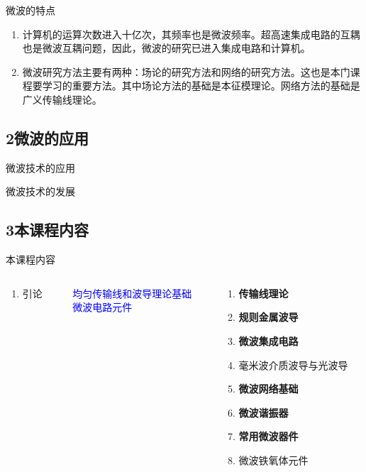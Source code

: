 \documentclass{ctexbeamer}
\newcounter{savedenum}
\newcommand*{\saveenum}{\setcounter{savedenum}{\theenumi}}
\newcommand*{\resume}{\setcounter{enumi}{\thesavedenum}}
\begin{document}
\begin{frame}{微波的特点}
  \begin{enumerate}
    \resume
    \item 计算机的运算次数进入十亿次，其频率也是微波频率。超高速集成电路的互耦也是微波互耦问题，因此，微波的研究已进入集成电路和计算机。
    \item 微波研究方法主要有两种：场论的研究方法和网络的研究方法。这也是本门课程要学习的重要方法。其中场论方法的基础是本征模理论。网络方法的基础是广义传输线理论。
  \end{enumerate}
\end{frame}

\subsection{2\quad 微波的应用}
\begin{frame}{微波技术的应用}
\end{frame}

\begin{frame}{微波技术的发展}

\end{frame}

\subsection{3\quad 本课程内容}
\begin{frame}{本课程内容}
  \begin{columns}
    \begin{column}{0.15\linewidth}
      \begin{enumerate}
        \item 引论
        \saveenum
      \end{enumerate}
    \end{column}
    \begin{column}{0.35\linewidth}
      \textcolor{blue}{均匀传输线和波导理论基础}\\
      \textcolor{blue}{微波电路元件}
    \end{column}
    \begin{column}{0.5\linewidth}
      \begin{enumerate}
        \resume
        \item \textbf{传输线理论}
        \item \textbf{规则金属波导}
        \item \textbf{微波集成电路}
        \item 毫米波介质波导与光波导
        \item \textbf{微波网络基础}
        \item \textbf{微波谐振器}
        \item \textbf{常用微波器件}
        \item 微波铁氧体元件
      \end{enumerate}
    \end{column}
  \end{columns}
\end{frame}
\end{document}
